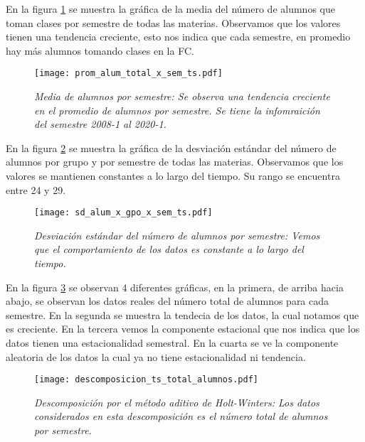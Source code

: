 En la figura \ref{prom_alum_x_sem_ts} se muestra la gráfica de la media del número de alumnos que toman clases por semestre de todas las materias. Observamos que los valores tienen una tendencia creciente, esto nos indica que cada semestre, en promedio hay más alumnos tomando clases en la FC.

\begin{figure}[H]
\centering
\texttt{[image: prom\_alum\_total\_x\_sem\_ts.pdf]} %
\caption[\textit{Media de alumnos por semestre}]{\textit{Media de alumnos por semestre: Se observa una tendencia creciente en el promedio de alumnos por semestre. Se tiene la infomraición del semestre 2008-1 al 2020-1.}}\label{prom_alum_x_sem_ts}
\end{figure}

En la figura \ref{sd_alum_x_gpo_x_sem_ts} se muestra la gráfica de la desviación estándar del número de alumnos por grupo y por semestre de todas las materias. Observamos que los valores se mantienen constantes a lo largo del tiempo. Su rango se encuentra entre 24 y 29.

\begin{figure}[H]
\centering
\texttt{[image: sd\_alum\_x\_gpo\_x\_sem\_ts.pdf]} %
\caption[\textit{Desviación estándar del número de alumnos por semestre}]{\textit{Desviación estándar del número de alumnos por semestre: Vemos que el comportamiento de los datos es constante a lo largo del tiempo.}}\label{sd_alum_x_gpo_x_sem_ts}
\end{figure}

En la figura \ref{img_en_ing_2} se observan 4 diferentes gráficas, en la primera, de arriba hacia abajo, se observan los datos reales del número total de alumnos para cada semestre. En la segunda se muestra la tendecia de los datos, la cual notamos que es creciente. En la tercera vemos la componente estacional que nos indica que los datos tienen una estacionalidad semestral. En la cuarta se ve la componente aleatoria de los datos la cual ya no tiene estacionalidad ni tendencia.

\begin{figure}[H]
\centering
\texttt{[image: descomposicion\_ts\_total\_alumnos.pdf]} %
\caption[\textit{Descomposición por el método aditivo de Holt-Winters}]{\textit{Descomposición por el método aditivo de Holt-Winters: Los datos considerados en esta descomposición es el número total de alumnos por semestre.}}\label{img_en_ing_2}
\end{figure}

